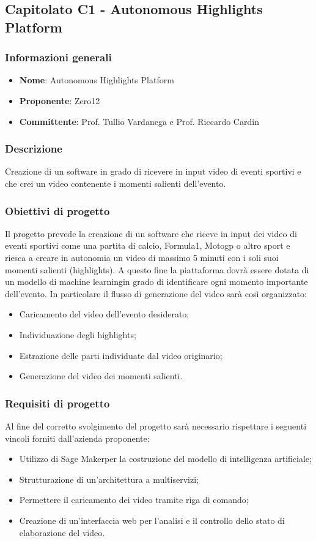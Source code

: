 \subsection{Capitolato C1 - Autonomous Highlights Platform}
\subsubsection{Informazioni generali}
\begin{itemize}
	\item \textbf{Nome}: Autonomous Highlights Platform
	\item \textbf{Proponente}: Zero12
	\item \textbf{Committente}: Prof. Tullio Vardanega e Prof. Riccardo Cardin
\end{itemize}
\subsubsection{Descrizione}
Creazione di un software in grado di ricevere in input video di eventi sportivi e che crei un video contenente i momenti salienti dell'evento.
\subsubsection{Obiettivi di progetto}
Il progetto prevede la creazione di un software che riceve in input dei video di eventi sportivi come una partita di calcio, Formula1, Motogp o altro sport e riesca a creare in autonomia un video di massimo 5 minuti con i soli suoi momenti salienti (highlights). A questo fine la piattaforma dovrà essere dotata di un modello di machine learning\glo in grado di identificare ogni momento importante dell’evento.
In particolare il flusso di generazione del video sarà così organizzato:
\begin{itemize}
	\item Caricamento del video dell'evento desiderato;
	\item Individuazione degli highlights;
	\item Estrazione delle parti individuate dal video originario;
	\item Generazione del video dei momenti salienti.
\end{itemize}
\subsubsection{Requisiti di progetto}
Al fine del corretto svolgimento del progetto sarà necessario rispettare i seguenti vincoli forniti dall'azienda proponente:
\begin{itemize}
	\item Utilizzo di Sage Maker\glo per la costruzione del modello di intelligenza artificiale\glo;
	\item Strutturazione di un'architettura a multiservizi\glo;
	\item Permettere il caricamento dei video tramite riga di comando;
	\item Creazione di un'interfaccia web per l'analisi e il controllo dello stato di elaborazione del video.
\end{itemize}
